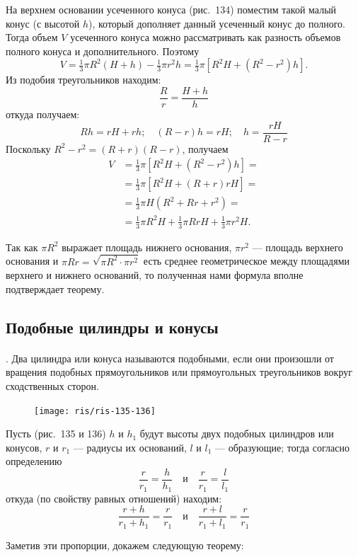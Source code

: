 \documentclass[twoside]{book}
\begin{document}
На верхнем основании усеченного конуса (рис.~134) поместим такой малый конус (с высотой $h$), который дополняет данный усеченный конус до полного.
Тогда объем $V$ усеченного конуса можно рассматривать как разность объемов полного конуса и дополнительного.
Поэтому
\[V =\tfrac13 \pi R^2(H + h)-\tfrac13 \pi r^2h=\tfrac13 \pi [R^2H+(R^2-r^2)h].\]
Из подобия треугольников находим:
\[\frac Rr=\frac{H+h}h\]
откуда получаем:
\[Rh = rH + rh;
\quad
(R-r)h = rH;
\quad
h= \frac{rH}{R-r}
\]
Поскольку $R^2-r^2=(R+r)(R-r)$, получаем
\begin{align*}
V &= \tfrac13 \pi [R^2H+(R^2-r^2)h]=
\\
&= \tfrac13\pi  [R^2H + (R +r)rH]=
\\
&=
\tfrac13\pi H(R^2 + Rr + r^2)
= 
\\
&=\tfrac13\pi R^2 H+\tfrac13\pi Rr H+\tfrac13\pi r^2 H.
\end{align*}

Так как $\pi R^2$ выражает площадь нижнего основания, $\pi r^2$ --- площадь верхнего основания и $\pi Rr = \sqrt{\pi R^2\cdot \pi r^2}$ есть среднее геометрическое между площадями верхнего и нижнего оснований, то полученная нами формула вполне подтверждает теорему.

\subsection*{Подобные цилиндры и конусы}

\paragraph{}\label{1938/s123}
.
Два цилиндра или конуса называются подобными, если они произошли от вращения подобных прямоугольников или прямоугольных треугольников вокруг сходственных сторон.

\begin{figure}[h!]
\centering
\texttt{[image: ris/ris-135-136]}
\caption{}
\end{figure}

Пусть (рис.~135 и 136) $h$ и $h_1$ будут высоты двух подобных цилиндров или конусов, $r$ и $r_1$ --- радиусы их оснований, $l$ и $l_1$ --- образующие;
тогда согласно определению
\[\frac r{r_1}=\frac h{h_1}\quad\text{и}\quad\frac r{r_1}=\frac l{l_1}\]
откуда (по свойству равных отношений) находим: %
\[\frac {r+h}{r_1+h_1}=\frac r{r_1}
\quad\text{и}\quad
\frac {r+l}{r_1+l_1}=\frac r{r_1}\]


Заметив эти пропорции, докажем следующую теорему:
\end{document}
